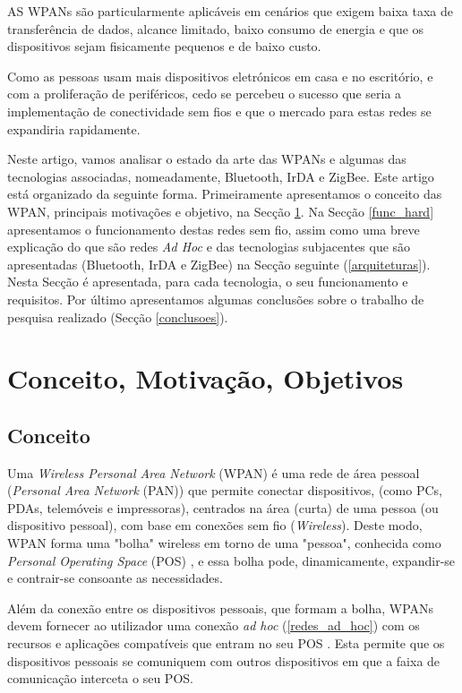 \documentclass[conference]{IEEEtran}
\begin{document}
AS WPANs são particularmente aplicáveis em cenários que exigem baixa taxa de transferência de dados, alcance limitado, baixo consumo de energia e que os dispositivos sejam fisicamente pequenos e de baixo custo.

Como as pessoas usam mais dispositivos eletrónicos em casa e no escritório, e com a proliferação de periféricos, cedo se percebeu o sucesso que seria a implementação de conectividade sem fios e que o mercado para estas redes se expandiria rapidamente.

Neste artigo, vamos analisar o estado da arte das WPANs e algumas das tecnologias associadas, nomeadamente, Bluetooth, IrDA e ZigBee.
Este artigo está organizado da seguinte forma.
Primeiramente apresentamos o conceito das WPAN, principais motivações e objetivo, na Secção \ref{conc_mot_obj}.
Na Secção \ref{func_hard} apresentamos o funcionamento destas redes sem fio, assim como uma breve explicação do que são redes \textit{Ad Hoc} e das tecnologias subjacentes que são apresentadas (Bluetooth, IrDA e ZigBee) na Secção seguinte (\ref{arquiteturas}).
Nesta Secção é apresentada, para cada tecnologia, o seu funcionamento e requisitos.
Por último apresentamos algumas conclusões sobre o trabalho de pesquisa realizado (Secção \ref{conclusoes}).


\section{Conceito, Motivação, Objetivos} \label{conc_mot_obj}

\subsection{Conceito}

Uma \textit{Wireless Personal Area Network} (WPAN) é uma rede de área pessoal (\textit{Personal Area Network} (PAN)) que permite conectar dispositivos, (como PCs, PDAs, telemóveis e impressoras), centrados na área (curta) de uma pessoa (ou dispositivo pessoal), com base em conexões sem fio (\textit{Wireless}). 
Deste modo, WPAN forma uma "bolha" wireless em torno de uma "pessoa", conhecida como \textit{Personal Operating Space} (POS) \cite{prasad2004ofdm}, e essa bolha pode, dinamicamente, expandir-se e contrair-se consoante as necessidades.

Além da conexão entre os dispositivos pessoais, que formam a bolha, WPANs devem fornecer ao utilizador uma conexão \textit{ad hoc} (\ref{redes_ad_hoc}) com os recursos e aplicações compatíveis que entram no seu POS \cite{prasad2004ofdm}.
Esta permite que os dispositivos pessoais se comuniquem com outros dispositivos em que a faixa de comunicação interceta o seu POS.
\end{document}
